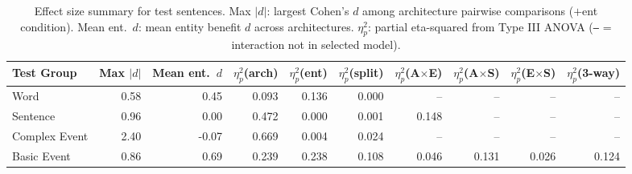 \begin{table}[t]
\centering\scriptsize
\begin{tabular}{@{}lrrrrrrrrr@{}}
\toprule
\textbf{Test Group} & \textbf{Max $|d|$} & \textbf{Mean ent.\ $d$} & $\eta^2_p$(arch) & $\eta^2_p$(ent) & $\eta^2_p$(split) & $\eta^2_p$(A$\times$E) & $\eta^2_p$(A$\times$S) & $\eta^2_p$(E$\times$S) & $\eta^2_p$(3-way) \\
\midrule
Word & 0.58 & 0.45 & 0.093 & 0.136 & 0.000 & -- & -- & -- & -- \\
Sentence & 0.96 & 0.00 & 0.472 & 0.000 & 0.001 & 0.148 & -- & -- & -- \\
Complex Event & 2.40 & -0.07 & 0.669 & 0.004 & 0.024 & -- & -- & -- & -- \\
Basic Event & 0.86 & 0.69 & 0.239 & 0.238 & 0.108 & 0.046 & 0.131 & 0.026 & 0.124 \\
\bottomrule
\end{tabular}
\caption{Effect size summary for test sentences. Max $|d|$: largest Cohen's $d$ among architecture pairwise comparisons ($+$ent condition). Mean ent.\ $d$: mean entity benefit $d$ across architectures. $\eta^2_p$: partial eta-squared from Type III ANOVA (\texttt{--} = interaction not in selected model).}
\label{tab:test_effect_sizes}
\end{table}

